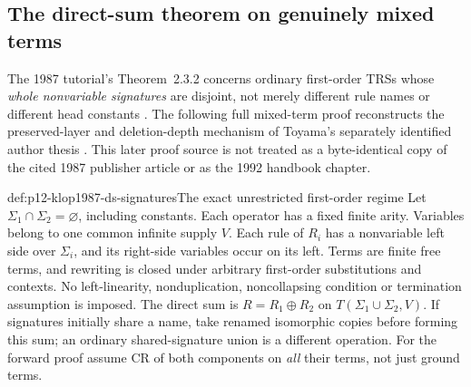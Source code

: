 \subsection{The direct-sum theorem on genuinely mixed terms}
\label{sec:p12-klop1987-direct-sum-proof}

The 1987 tutorial's Theorem~2.3.2 concerns ordinary first-order TRSs
whose \emph{whole nonvariable signatures} are disjoint, not merely
different rule names or different head constants
\parencite[pp.15--17]{Klop1987CWITutorial}. The following full
mixed-term proof reconstructs the preserved-layer and deletion-depth
mechanism of Toyama's separately identified author thesis
\parencite[\S2.2, pp.19--44]{Toyama1990DirectSumProof}.
This later proof source is not treated as a byte-identical copy of
the cited 1987 publisher article or as the 1992 handbook chapter.

\begin{hbdefinition}{def:p12-klop1987-ds-signatures}{The exact unrestricted first-order regime}
Let \(\Sigma_1\cap\Sigma_2=\varnothing\), including constants.
Each operator has a fixed finite arity. Variables belong to one
common infinite supply \(V\). Each rule of \(R_i\) has a
nonvariable left side over \(\Sigma_i\), and its right-side
variables occur on its left. Terms are finite free terms, and
rewriting is closed under arbitrary first-order substitutions and
contexts. No left-linearity, nonduplication, noncollapsing condition
or termination assumption is imposed. The direct sum is
\(R=R_1\oplus R_2\) on \(T(\Sigma_1\cup\Sigma_2,V)\).
If signatures initially share a name, take renamed isomorphic
copies before forming this sum; an ordinary shared-signature union
is a different operation.
For the forward proof assume CR of both components on \emph{all}
their terms, not just ground terms.
\end{hbdefinition}

